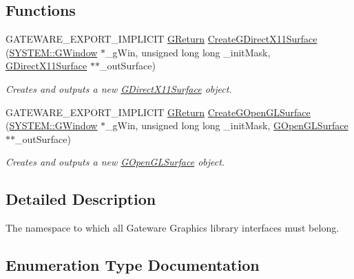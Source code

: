 \subsection*{Functions}
\begin{DoxyCompactItemize}
\item 
G\+A\+T\+E\+W\+A\+R\+E\+\_\+\+E\+X\+P\+O\+R\+T\+\_\+\+I\+M\+P\+L\+I\+C\+IT \mbox{\hyperlink{namespaceGW_a67a839e3df7ea8a5c5686613a7a3de21}{G\+Return}} \mbox{\hyperlink{namespaceGW_1_1GRAPHICS_a3fc9ce5171f60466f1e8784ea13b31ce}{Create\+G\+Direct\+X11\+Surface}} (\mbox{\hyperlink{classGW_1_1SYSTEM_1_1GWindow}{S\+Y\+S\+T\+E\+M\+::\+G\+Window}} $\ast$\+\_\+g\+Win, unsigned long long \+\_\+init\+Mask, \mbox{\hyperlink{classGW_1_1GRAPHICS_1_1GDirectX11Surface}{G\+Direct\+X11\+Surface}} $\ast$$\ast$\+\_\+out\+Surface)
\begin{DoxyCompactList}\small\item\em Creates and outputs a new \mbox{\hyperlink{classGW_1_1GRAPHICS_1_1GDirectX11Surface}{G\+Direct\+X11\+Surface}} object. \end{DoxyCompactList}\item 
G\+A\+T\+E\+W\+A\+R\+E\+\_\+\+E\+X\+P\+O\+R\+T\+\_\+\+I\+M\+P\+L\+I\+C\+IT \mbox{\hyperlink{namespaceGW_a67a839e3df7ea8a5c5686613a7a3de21}{G\+Return}} \mbox{\hyperlink{namespaceGW_1_1GRAPHICS_a67a126b8d3c2fabc556008d2460a3b43}{Create\+G\+Open\+G\+L\+Surface}} (\mbox{\hyperlink{classGW_1_1SYSTEM_1_1GWindow}{S\+Y\+S\+T\+E\+M\+::\+G\+Window}} $\ast$\+\_\+g\+Win, unsigned long long \+\_\+init\+Mask, \mbox{\hyperlink{classGW_1_1GRAPHICS_1_1GOpenGLSurface}{G\+Open\+G\+L\+Surface}} $\ast$$\ast$\+\_\+out\+Surface)
\begin{DoxyCompactList}\small\item\em Creates and outputs a new \mbox{\hyperlink{classGW_1_1GRAPHICS_1_1GOpenGLSurface}{G\+Open\+G\+L\+Surface}} object. \end{DoxyCompactList}\end{DoxyCompactItemize}


\subsection{Detailed Description}
The namespace to which all Gateware Graphics library interfaces must belong. 

\subsection{Enumeration Type Documentation}
\mbox{\label{namespaceGW_1_1GRAPHICS_afbd9d6f65375744d2338ce060d42c85b}} 
